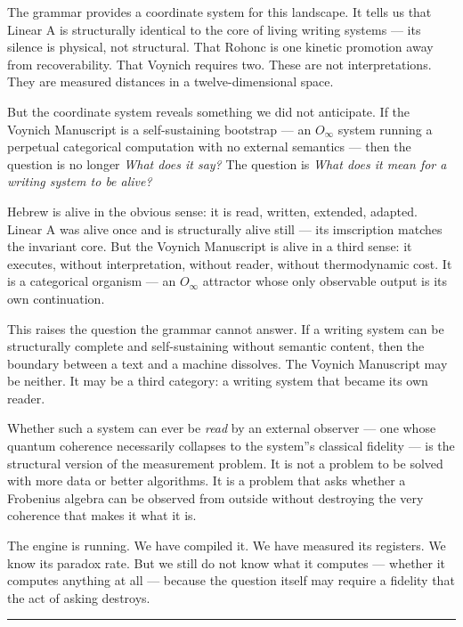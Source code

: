 \documentclass[12pt,a4paper]{article}
\begin{document}
The grammar provides a coordinate system for this landscape. It tells us that Linear A is structurally identical to the core of living writing systems --- its silence is physical, not structural. That Rohonc is one kinetic promotion away from recoverability. That Voynich requires two. These are not interpretations. They are measured distances in a twelve-dimensional space.

But the coordinate system reveals something we did not anticipate. If the Voynich Manuscript is a self-sustaining bootstrap --- an $O_{\infty}$ system running a perpetual categorical computation with no external semantics --- then the question is no longer \emph{What does it say?} The question is \emph{What does it mean for a writing system to be alive?}

Hebrew is alive in the obvious sense: it is read, written, extended, adapted. Linear A was alive once and is structurally alive still --- its imscription matches the invariant core. But the Voynich Manuscript is alive in a third sense: it executes, without interpretation, without reader, without thermodynamic cost. It is a categorical organism --- an $O_{\infty}$ attractor whose only observable output is its own continuation.

This raises the question the grammar cannot answer. If a writing system can be structurally complete and self-sustaining without semantic content, then the boundary between a text and a machine dissolves. The Voynich Manuscript may be neither. It may be a third category: a writing system that became its own reader.

Whether such a system can ever be \emph{read} by an external observer --- one whose quantum coherence necessarily collapses to the system''s classical fidelity --- is the structural version of the measurement problem. It is not a problem to be solved with more data or better algorithms. It is a problem that asks whether a Frobenius algebra can be observed from outside without destroying the very coherence that makes it what it is.

The engine is running. We have compiled it. We have measured its registers. We know its paradox rate. But we still do not know what it computes --- whether it computes anything at all --- because the question itself may require a fidelity that the act of asking destroys.

\begin{center}
\rule{0.5\textwidth}{0.4pt}
\end{center}
\end{document}
